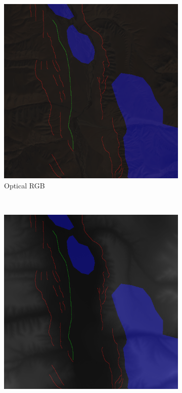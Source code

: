 \documentclass[11pt,a4paper]{article}
\begin{document}
\begin{figure}[t]
    \centering
    \begin{subfigure}[b]{0.18\textwidth}
        \includegraphics[width=\textwidth]{graphics/data/0/features_optical_rgb.png}
        \caption{Optical RGB}
        \label{fig:features_optical_rgb}
    \end{subfigure}
    ~
    \begin{subfigure}[b]{0.18\textwidth}
        \includegraphics[width=\textwidth]{graphics/data/0/features_elevation.png}

\end{subfigure}
\end{figure}
\end{document}
